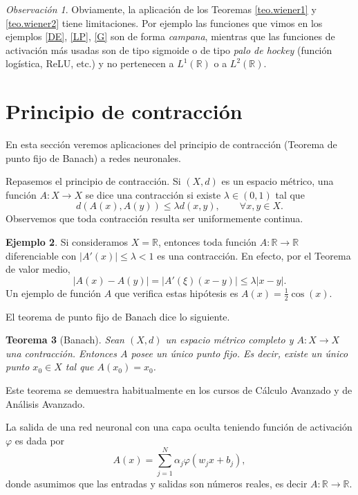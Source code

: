 \documentclass[12pt, a4paper]{amsbook}
\newcommand{\R}{{\mathbb R}}
\newtheorem{teo}{Teorema}[section]
\theoremstyle{remark}
\newtheorem{obs}[teo]{Observaci\'on}
\theoremstyle{definition}
\newtheorem{ejem}[teo]{Ejemplo}
\numberwithin{section}{chapter}
\numberwithin{subsection}{section}
\numberwithin{equation}{section}
\numberwithin{figure}{chapter}
\begin{document}
\begin{obs}
Obviamente, la aplicación de los Teoremas \ref{teo.wiener1} y \ref{teo.wiener2} tiene limitaciones. Por ejemplo las funciones que vimos en los ejemplos \ref{DE}, \ref{LP}, \ref{G} son de forma {\em campana}, mientras que las funciones de activación más usadas son de tipo sigmoide o de tipo {\em palo de hockey} (función logística, ReLU, etc.) y no pertenecen a $L^1(\R)$ o a $L^2(\R)$.
\end{obs}

\section{Principio de contracción}\label{sec.c7.5}
En esta sección veremos aplicaciones del principio de contracción (Teorema de punto fijo de Banach) a redes neuronales.

Repasemos el principio de contracción. Si $(X, d)$ es un espacio métrico, una función $A\colon X\to X$ se dice una contracción si existe $\lambda\in (0,1)$ tal que
$$
d(A(x), A(y))\le \lambda d(x, y),\qquad \forall x, y\in X.
$$
Observemos que toda contracción resulta ser uniformemente continua.

\begin{ejem}
Si consideramos $X=\R$, entonces toda función $A\colon \R\to\R$ diferenciable con $|A'(x)|\le\lambda<1$ es una contracción. En efecto, por el Teorema de valor medio,
$$
|A(x)-A(y)| = |A'(\xi)(x-y)|\le \lambda |x-y|.
$$
Un ejemplo de función $A$ que verifica estas hipótesis es $A(x) = \frac12\cos(x)$.
\end{ejem}

El teorema de punto fijo de Banach dice lo siguiente.
\begin{teo}[Banach]\label{teo.punto.fijo}
Sean $(X, d)$ un espacio métrico completo y $A\colon X\to X$ una contracción. Entonces $A$ posee un único punto fijo. Es decir, existe un único punto $x_0\in X$ tal que $A(x_0) = x_0$.
\end{teo}

Este teorema se demuestra habitualmente en los cursos de Cálculo Avanzado y de Análisis Avanzado.


La salida de una red neuronal con una capa oculta teniendo función de activación $\varphi$ es dada por
\begin{equation}\label{formulaA}
A(x) = \sum_{j=1}^N \alpha_j \varphi(w_j x + b_j),
\end{equation}
donde asumimos que las entradas y salidas son números reales, es decir $A\colon\R\to\R$.
\end{document}
